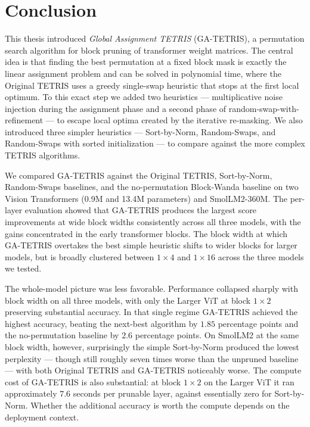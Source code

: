 \chapter*{Conclusion} %

This thesis introduced \emph{Global Assignment TETRIS} (GA-TETRIS), a permutation search algorithm for block pruning of transformer weight matrices. The central idea is that finding the best permutation at a fixed block mask is exactly the linear assignment problem and can be solved in polynomial time, where the Original TETRIS uses a greedy single-swap heuristic that stops at the first local optimum. To this exact step we added two heuristics --- multiplicative noise injection during the assignment phase and a second phase of random-swap-with-refinement --- to escape local optima created by the iterative re-masking. We also introduced three simpler heuristics --- Sort-by-Norm, Random-Swaps, and Random-Swaps with sorted initialization --- to compare against the more complex TETRIS algorithms.

We compared GA-TETRIS against the Original TETRIS, Sort-by-Norm, Random-Swaps baselines, and the no-permutation Block-Wanda baseline on two Vision Transformers (0.9M and 13.4M parameters) and SmolLM2-360M. The per-layer evaluation showed that GA-TETRIS produces the largest score improvements at wide block widths consistently across all three models, with the gains concentrated in the early transformer blocks. The block width at which GA-TETRIS overtakes the best simple heuristic shifts to wider blocks for larger models, but is broadly clustered between $1 \times 4$ and $1 \times 16$ across the three models we tested.

The whole-model picture was less favorable. Performance collapsed sharply with block width on all three models, with only the Larger ViT at block $1 \times 2$ preserving substantial accuracy. In that single regime GA-TETRIS achieved the highest accuracy, beating the next-best algorithm by $1.85$ percentage points and the no-permutation baseline by $2.6$ percentage points. On SmolLM2 at the same block width, however, surprisingly the simple Sort-by-Norm produced the lowest perplexity — though still roughly seven times worse than the unpruned baseline — with both Original TETRIS and GA-TETRIS noticeably worse. The compute cost of GA-TETRIS is also substantial: at block $1 \times 2$ on the Larger ViT it ran approximately $7.6$ seconds per prunable layer, against essentially zero for Sort-by-Norm. Whether the additional accuracy is worth the compute depends on the deployment context.

